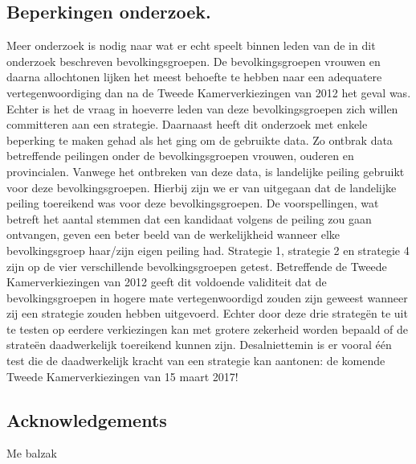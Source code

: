 \subsection*{Beperkingen onderzoek.}
Meer onderzoek is nodig naar wat er echt speelt binnen leden van de in dit onderzoek beschreven bevolkingsgroepen. De bevolkingsgroepen vrouwen en daarna allochtonen lijken het meest behoefte te hebben naar een adequatere vertegenwoordiging dan na de Tweede Kamerverkiezingen van 2012 het geval was. Echter is het de vraag in hoeverre leden van deze bevolkingsgroepen zich willen committeren aan een strategie. Daarnaast heeft dit onderzoek met enkele beperking te maken gehad als het ging om de gebruikte data. Zo ontbrak data betreffende peilingen onder de bevolkingsgroepen vrouwen, ouderen en provincialen. Vanwege het ontbreken van deze data, is landelijke peiling gebruikt voor deze bevolkingsgroepen. Hierbij zijn we er van uitgegaan dat de landelijke peiling toereikend was voor deze bevolkingsgroepen. De voorspellingen, wat betreft het aantal stemmen dat een kandidaat volgens de peiling zou gaan ontvangen, geven een beter beeld van de werkelijkheid wanneer elke bevolkingsgroep haar/zijn eigen peiling had. Strategie 1, strategie 2 en strategie 4 zijn op de vier verschillende bevolkingsgroepen getest. Betreffende de Tweede Kamerverkiezingen van 2012 geeft dit voldoende validiteit dat de bevolkingsgroepen in hogere mate vertegenwoordigd zouden zijn geweest wanneer zij een strategie zouden hebben uitgevoerd. Echter door deze drie strateg\"{e}n te uit te testen op eerdere verkiezingen kan met grotere zekerheid worden bepaald of de strate\"{e}n daadwerkelijk toereikend kunnen zijn. Desalniettemin is er vooral één test die de daadwerkelijk kracht van een strategie kan aantonen: de komende Tweede Kamerverkiezingen van 15 maart 2017!


\subsection{Acknowledgements}
Me balzak




























